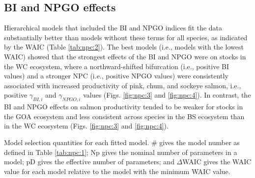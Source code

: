 \subsection{BI and NPGO effects}

Hierarchical models that included the BI and NPGO indices fit the data
substantially better than models without these terms for all species, as
indicated by the WAIC (Table \ref{tab:npc:2}). The best models (i.e., models
with the lowest WAIC) showed that the strongest effects of the BI and NPGO were
on stocks in the WC ecosystem, where a northward-shifted bifurcation (i.e.,
positive BI values) and a stronger NPC (i.e., positive NPGO values) were
consistently associated with increased productivity of pink, chum, and sockeye
salmon, i.e., positive \(\gamma_{BI,i}\) and \(\gamma_{NPGO,i}\) values (Figs.
\ref{fig:npc:3} and \ref{fig:npc:4}). In contrast, the BI and NPGO effects on
salmon productivity tended to be weaker for stocks in the GOA ecosystem and less
consistent across species in the BS ecosystem than in the WC ecosystem (Figs.
\ref{fig:npc:3} and \ref{fig:npc:4}).

\begin{table}[htbp]
  \small \centering \libertineLF
  \caption[Model selection quantities for each fitted model]{Model selection
           quantities for each fitted model. \# gives the model number as
           defined in Table \ref{tab:npc:1}; Np gives the nominal number of
           parameters in a model; pD gives the effective number of parameters;
           and $\Delta$WAIC gives the WAIC value for each model relative to the
           model with the minimum WAIC value.}
  
  \label{tab:npc:2}
\end{table}

